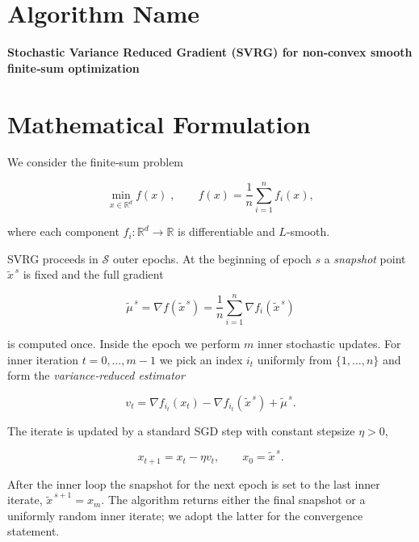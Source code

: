 \documentclass{article}
\begin{document}
\section*{Algorithm Name}
\textbf{Stochastic Variance Reduced Gradient (SVRG) for non‑convex smooth finite‑sum optimization}

\section*{Mathematical Formulation}
We consider the finite‑sum problem  

\[
\min_{x\in\mathbb{R}^{d}} f(x)\;,\qquad 
f(x)=\frac1n\sum_{i=1}^{n} f_i(x),
\]

where each component \(f_i:\mathbb{R}^{d}\!\to\!\mathbb{R}\) is differentiable and \(L\)-smooth.  

SVRG proceeds in \(\mathcal{S}\) outer epochs.  At the beginning of epoch \(s\) a \emph{snapshot} point
\(\tilde{x}^{\,s}\) is fixed and the full gradient  

\[
\tilde{\mu}^{\,s}= \nabla f(\tilde{x}^{\,s})=\frac1n\sum_{i=1}^{n}\nabla f_i(\tilde{x}^{\,s})
\tag{1}
\]

is computed once.  Inside the epoch we perform \(m\) inner stochastic updates.  
For inner iteration \(t=0,\dots,m-1\) we pick an index \(i_t\) uniformly from \(\{1,\dots,n\}\) and form the
\emph{variance‑reduced estimator}

\[
v_t = \nabla f_{i_t}(x_t) - \nabla f_{i_t}(\tilde{x}^{\,s}) + \tilde{\mu}^{\,s}.
\tag{2}
\]

The iterate is updated by a standard SGD step with constant stepsize \(\eta>0\),

\[
x_{t+1}=x_t-\eta v_t,\qquad x_0=\tilde{x}^{\,s}.
\tag{3}
\]

After the inner loop the snapshot for the next epoch is set to the last inner iterate,
\(\tilde{x}^{\,s+1}=x_m\).  The algorithm returns either the final snapshot or a uniformly
random inner iterate; we adopt the latter for the convergence statement.
\end{document}
